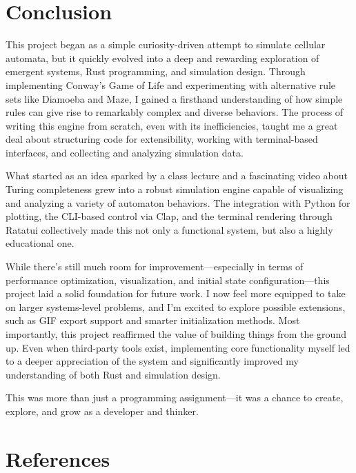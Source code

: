 \documentclass[12pt]{article}
\begin{document}
\section{Conclusion}

This project began as a simple curiosity-driven attempt to simulate cellular automata, but it quickly evolved into a deep and rewarding exploration of emergent systems, Rust programming, and simulation design. Through implementing Conway's Game of Life and experimenting with alternative rule sets like Diamoeba and Maze, I gained a firsthand understanding of how simple rules can give rise to remarkably complex and diverse behaviors. The process of writing this engine from scratch, even with its inefficiencies, taught me a great deal about structuring code for extensibility, working with terminal-based interfaces, and collecting and analyzing simulation data.

What started as an idea sparked by a class lecture and a fascinating video about Turing completeness grew into a robust simulation engine capable of visualizing and analyzing a variety of automaton behaviors. The integration with Python for plotting, the CLI-based control via Clap, and the terminal rendering through Ratatui collectively made this not only a functional system, but also a highly educational one.

While there's still much room for improvement—especially in terms of performance optimization, visualization, and initial state configuration—this project laid a solid foundation for future work. I now feel more equipped to take on larger systems-level problems, and I'm excited to explore possible extensions, such as GIF export support and smarter initialization methods. Most importantly, this project reaffirmed the value of building things from the ground up. Even when third-party tools exist, implementing core functionality myself led to a deeper appreciation of the system and significantly improved my understanding of both Rust and simulation design.

This was more than just a programming assignment—it was a chance to create, explore, and grow as a developer and thinker.

\newpage
\section{References}
\nocite{hugcis_rustca}
\printbibliography[heading=none]
\end{document}
